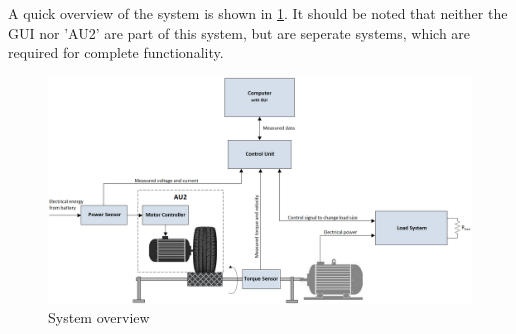 A quick overview of the system is shown in \ref{fig:System_overview}. It should be noted that neither the GUI nor 'AU2' are part of this system, but are seperate systems, which are required for complete functionality.

\begin{figure}[H]
	\centering
	\includegraphics[width=1\linewidth]{Introduction/Overview}
	\caption{System overview}
	\label{fig:System_overview}
\end{figure}

